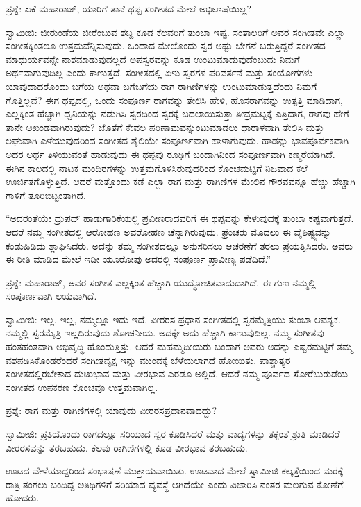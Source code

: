 ಪ್ರಶ್ನೆ: ಏಕೆ ಮಹಾರಾಜ್, ಯಾರಿಗೆ ತಾನೆ ಥಪ್ಪ ಸಂಗೀತದ ಮೇಲೆ ಅಭಿಲಾಷೆಯಿಲ್ಲ?

ಸ್ವಾಮೀಜಿ: ಜೀರುಂಡೆಯ ಜೀರೆಂಬುವ ಶಬ್ದ ಕೂಡ ಕೆಲವರಿಗೆ ತುಂಬಾ ಇಷ್ಟ. ಸಂತಾಲರಿಗೆ ಅವರ ಸಂಗೀತವೇ ಎಲ್ಲಾ ಸಂಗೀತಕ್ಕಿಂತಲೂ ಉತ್ತಮವೆನ್ನಿಸುವುದು. ಒಂದಾದ ಮೇಲೊಂದು ಸ್ವರ ಅಷ್ಟು ಬೇಗನೆ ಬರುತ್ತಿದ್ದರೆ ಸಂಗೀತದ ಮಾಧುರ್ಯವನ್ನೇ ನಾಶಮಾಡುವುದಲ್ಲದೆ ಅಪಸ್ವರವನ್ನು ಕೂಡ ಉಂಟುಮಾಡುವುದೆಂಬುದು ನಿಮಗೆ ಅರ್ಥವಾಗುವುದಿಲ್ಲ ಎಂದು ಕಾಣುತ್ತದೆ. ಸಂಗೀತದಲ್ಲಿ ಏಳು ಸ್ವರಗಳ ಪರಿವರ್ತನೆ ಮತ್ತು ಸಂಯೋಗಗಳು ಯಾವುದಾದರೊಂದು ಬಗೆಯ ಅಥವಾ ಬಗೆಬಗೆಯ ರಾಗ ರಾಗಿಣಿಗಳನ್ನು ಉಂಟುಮಾಡುತ್ತದೆಂದು ನಿಮಗೆ ಗೊತ್ತಿಲ್ಲವೆ? ಈಗ ಥಪ್ಪದಲ್ಲಿ, ಒಂದು ಸಂಪೂರ್ಣ ರಾಗವನ್ನು ತೇಲಿಸಿ ಹೇಳಿ, ಹೊಸರಾಗವನ್ನು ಉತ್ಪತ್ತಿ ಮಾಡಿದಾಗ, ಎಲ್ಲಕ್ಕಿಂತ ಹೆಚ್ಚಾಗಿ ಧ್ವನಿಯನ್ನು ನಡುಗಿಸಿ ಸ್ವರದಿಂದ ಸ್ವರಕ್ಕೆ ಬದಲಾಯಿಸುತ್ತಾ ತೀವ್ರಮಟ್ಟಕ್ಕೆ ಎತ್ತಿದಾಗ, ರಾಗವು ಹೇಗೆ ತಾನೇ ಅಖಂಡವಾಗಿರುವುದು? ಜೊತೆಗೆ ಕೇವಲ ಪರಿಣಾಮವನ್ನುಂಟುಮಾಡಲು ಧಾರಾಳವಾಗಿ ತೇಲಿಸಿ ಮತ್ತು ಲಘುವಾಗಿ ಎಳೆಯುವುದರಿಂದ ಸಂಗೀತದ ಶೈಲಿಯೇ ಸಂಪೂರ್ಣವಾಗಿ ಹಾಳಾಗುವುದು. ಹಾಡನ್ನು ಭಾವಪೂರ್ವಕವಾಗಿ ಅದರ ಅರ್ಥ ತಿಳಿಯುವಂತೆ ಹಾಡುವುದು ಈ ಥಪ್ಪವು ರೂಢಿಗೆ ಬಂದಾಗಿನಿಂದ ಸಂಪೂರ್ಣವಾಗಿ ಕಣ್ಮರೆಯಾಗಿದೆ. ಈಗಿನ ಕಾಲದಲ್ಲಿ ನಾಟಕ ಮಂದಿರಗಳನ್ನು ಉತ್ತಮಗೊಳಿಸಿರುವುದರಿಂದ ಕೊಂಚಮಟ್ಟಿಗೆ ನಿಜವಾದ ಕಲೆ ಊರ್ಜಿತಗೊಳ್ಳುತ್ತಿದೆ. ಆದರೆ ಮತ್ತೊಂದು ಕಡೆ ಎಲ್ಲಾ ರಾಗ ಮತ್ತು ರಾಗಿಣಿಗಳ ಮೇಲಿನ ಗೌರವವನ್ನೂ ಹೆಚ್ಚು ಹೆಚ್ಚಾಗಿ ಗಾಳಿಗೆ ತೂರಿಬಿಟ್ಟಂತಾಗಿದೆ.

“ಅದರಂತೆಯೇ ಧ್ರುಪದ್ ಹಾಡುಗಾರಿಕೆಯಲ್ಲಿ ಪ್ರವೀಣರಾದವರಿಗೆ ಈ ಥಪ್ಪವನ್ನು ಕೇಳುವುದಕ್ಕೆ ತುಂಬಾ ಕಷ್ಟವಾಗುತ್ತದೆ. ಆದರೆ ನಮ್ಮ ಸಂಗೀತದಲ್ಲಿ ಆರೋಹಣ ಅವರೋಹಣ ಚೆನ್ನಾಗಿರುವುದು. ಫ್ರೆಂಚರು ಮೊದಲು ಈ ವೈಶಿಷ್ಟ್ಯವನ್ನು ಕಂಡುಹಿಡಿದು ಶ್ಲಾಘಿಸಿದರು. ಅದನ್ನು ತಮ್ಮ ಸಂಗೀತದಲ್ಲೂ ಅನುಸರಿಸಲು ಆಚರಣೆಗೆ ತರಲು ಪ್ರಯತ್ನಿಸಿದರು. ಅವರು ಈ ರೀತಿ ಮಾಡಿದ ಮೇಲೆ ಇಡೀ ಯೂರೋಪು ಅದರಲ್ಲಿ ಸಂಪೂರ್ಣ ಪ್ರಾವೀಣ್ಯ ಪಡೆದಿದೆ.”

ಪ್ರಶ್ನೆ: ಮಹಾರಾಜ್, ಅವರ ಸಂಗೀತ ಎಲ್ಲಕ್ಕಿಂತ ಹೆಚ್ಚಾಗಿ ಯುದ್ಧೋಚಿತವಾದುದಾಗಿದೆ. ಈ ಗುಣ ನಮ್ಮಲ್ಲಿ ಸಂಪೂರ್ಣವಾಗಿ ಲಯವಾಗಿದೆ.

ಸ್ವಾಮೀಜಿ: ಇಲ್ಲ, ಇಲ್ಲ, ನಮ್ಮಲ್ಲೂ ಇದು ಇದೆ. ವೀರರಸ ಪ್ರಧಾನ ಸಂಗೀತದಲ್ಲಿ ಸ್ವರಮೈತ್ರಿಯು ತುಂಬಾ ಆವಶ್ಯಕ. ನಮ್ಮಲ್ಲಿ ಸ್ವರಮೈತ್ರಿ ಇಲ್ಲದಿರುವುದು ಶೋಚನೀಯ. ಅದಕ್ಕೇ ಅದು ಹೆಚ್ಚಾಗಿ ಕಾಣುವುದಿಲ್ಲ. ನಮ್ಮ ಸಂಗೀತವು ಹಂತಹಂತವಾಗಿ ಅಭಿವೃದ್ಧಿ ಹೊಂದುತ್ತಿತ್ತು. ಆದರೆ ಮಹಮ್ಮದೀಯರು ಬಂದಾಗ ಅವರು ಅದನ್ನು ಎಷ್ಟರಮಟ್ಟಿಗೆ ತಮ್ಮ ವಶಪಡಿಸಿಕೊಂಡರೆಂದರೆ ಸಂಗೀತವೃಕ್ಷ ಇನ್ನು ಮುಂದಕ್ಕೆ ಬೆಳೆಯಲಾಗದೆ ಹೋಯಿತು. ಪಾಶ್ಚಾತ್ಯರ ಸಂಗೀತದಲ್ಲಿರಬೇಕಾದ ದುಃಖಭಾವ ಮತ್ತು ವೀರಭಾವ ಎರಡೂ ಅಲ್ಲಿದೆ. ಆದರೆ ನಮ್ಮ ಪೂರ್ವದ ಸೋರೆಬುರುಡೆಯ ಸಂಗೀತದ ಉಪಕರಣ ಕೊಂಚವೂ ಉತ್ತಮವಾಗಿಲ್ಲ.

ಪ್ರಶ್ನೆ: ರಾಗ ಮತ್ತು ರಾಗಿಣಿಗಳಲ್ಲಿ ಯಾವುದು ವೀರರಸಪ್ರಧಾನವಾದದ್ದು?

ಸ್ವಾಮೀಜಿ: ಪ್ರತಿಯೊಂದು ರಾಗದಲ್ಲೂ ಸರಿಯಾದ ಸ್ವರ ಕೂಡಿಸಿದರೆ ಮತ್ತು ವಾದ್ಯಗಳನ್ನು ತಕ್ಕಂತೆ ಶ್ರುತಿ ಮಾಡಿದರೆ ವೀರರಸವನ್ನು ತರಬಹುದು. ಕೆಲವು ರಾಗಿಣಿಗಳಲ್ಲಿ ಕೂಡ ವೀರಭಾವ ತರಬಹುದು.

ಊಟದ ವೇಳೆಯಾದ್ದರಿಂದ ಸಂಭಾಷಣೆ ಮುಕ್ತಾಯವಾಯಿತು. ಊಟವಾದ ಮೇಲೆ ಸ್ವಾಮೀಜಿ ಕಲ್ಕತ್ತೆಯಿಂದ ಮಠಕ್ಕೆ ರಾತ್ರಿ ತಂಗಲು ಬಂದಿದ್ದ ಅತಿಥಿಗಳಿಗೆ ಸರಿಯಾದ ವ್ಯವಸ್ಥೆ ಆಗಿದೆಯೇ ಎಂದು ವಿಚಾರಿಸಿ ನಂತರ ಮಲಗುವ ಕೋಣೆಗೆ ಹೋದರು.

